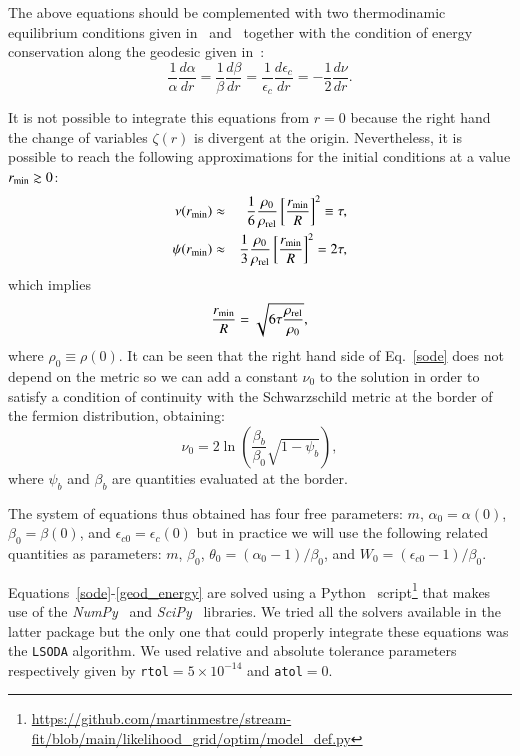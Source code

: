 \documentclass[twocolumn]{aa}
\begin{document}
The above equations should be complemented with two thermodinamic equilibrium conditions given
in~\citet{PhysRev.35.904} and~\citet{RevModPhys.21.531} together with the condition of energy conservation
along the geodesic given in~\citet{1989A&A...221....4M}:
\begin{equation}
   \frac{1}{\alpha}\frac{d\alpha}{dr}=\frac{1}{\beta}\frac{d\beta}{dr}=
   \frac{1}{\epsilon_c}\frac{d\epsilon_c}{dr}=-\frac{1}{2}\frac{d\nu}{dr}.
   \label{geod_energy}
\end{equation}

It is not possible to integrate this equations from $r=0$ because the right hand the change of variables $\zeta(r)$ is divergent at the origin. Nevertheless, it is possible
to reach the following approximations for the initial conditions at a value $r_{\rm{min}}\gtrsim 0$:
\begin{eqnarray}
   \nu(r_{\rm{min}}) &\approx& \frac{1}{6}\frac{\rho_0}{\rho_{\rm{rel}}}\left[\frac{r_{\rm{min}}}{R}\right]^2\equiv\tau, \\
   \psi(r_{\rm{min}})&\approx&\frac{1}{3}\frac{\rho_0}{\rho_{\rm{rel}}}\left[\frac{r_{\rm{min}}}{R}\right]^2=2\tau,
\end{eqnarray}
which implies
\begin{equation}
   \frac{r_{\rm{min}}}{R}=\sqrt{6\tau\frac{\rho_{\rm{rel}}}{\rho_0}},
\end{equation}
where $\rho_0\equiv \rho(0)$.
It can be seen that the right hand side of Eq.~\ref{sode} does not depend on the metric so we can add
a constant $\nu_0$ to the solution in order to satisfy a condition of continuity with the Schwarzschild metric at the border of the fermion distribution, obtaining:
$$\nu_0 = 2\ln\left(\frac{\beta_b}{\beta_0}\sqrt{1-\psi_b}\right),$$
where $\psi_b$ and $\beta_b$ are quantities evaluated at the border.

The system of equations thus obtained has four free parameters: $m$, $\alpha_0=\alpha(0)$,
$\beta_0=\beta(0)$, and $\epsilon_{c0}=\epsilon_c(0)$ but in practice we will use the following related
quantities as parameters:
$m$, $\beta_0$, $\theta_0=(\alpha_0-1)/\beta_0$, and $W_0=(\epsilon_{c0}-1)/\beta_0$.

Equations~\ref{sode}-\ref{geod_energy} are solved using
a {\sc Python}~\citep{van1995python} script\footnote{
\url{https://github.com/martinmestre/stream-fit/blob/main/likelihood_grid/optim/model_def.py}
}
that makes use of the {\it NumPy}~\citep{2020SciPy-NMeth} and {\it SciPy}~\citep{harris2020array} libraries. We tried all the solvers available in the latter package but the only one that
could properly integrate these equations was the \texttt{LSODA} algorithm. We used relative and absolute tolerance parameters respectively given by \texttt{rtol}$=5\times10^{-14}$ and \texttt{atol}$=0$.
\end{document}
